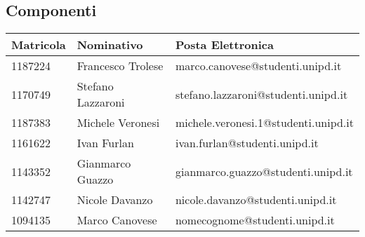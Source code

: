 \subsection{Componenti}
\begin{center}

	\begin{longtable}{p{4cm}|p{4cm}|p{6cm}}
		\arrayrulecolor{white}
		\hline
		\rowcolor{lighter-grayer}
		\textbf{Matricola}  &
		\textbf{Nominativo} &
		\textbf{Posta Elettronica}                                              \\
		\hline
		1187224             & Francesco Trolese & marco.canovese@studenti.unipd.it \\
		1170749             & Stefano Lazzaroni & stefano.lazzaroni@studenti.unipd.it \\
		1187383             & Michele Veronesi  & michele.veronesi.1@studenti.unipd.it \\
		1161622             & Ivan Furlan       & ivan.furlan@studenti.unipd.it \\
		1143352             & Gianmarco Guazzo  & gianmarco.guazzo@studenti.unipd.it \\
		1142747             & Nicole Davanzo    & nicole.davanzo@studenti.unipd.it \\
		1094135             & Marco Canovese    & nomecognome@studenti.unipd.it \\
	\end{longtable}
\end{center}
